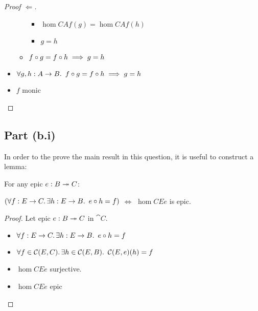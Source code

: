\begin{prop}
\begin{proof}[Proof $\Leftarrow$]
\begin{itemize}
\begin{itemize}
\begin{itemize}
            \item[\iffs] $\hom{C}{A}{f}(g) = \hom{C}{A}{f}(h)$
              \marginnote{\Def-\ref{def:co-hom}}

            \item[\imps] $g = h$
            \end{itemize}

          \item[\imps] $f\compose g = f\compose h \implies g = h$
            \marginnote{\imps-\Intro-$\dagger$}
        \end{itemize}
      \item[\imps] $\forall g, h : A \to B\ldotp~f\compose g = f\compose h \implies g = h$
        \marginnote{$\forall$-\Intro-$\star$}

      \item[\iffs] $f$ monic
        \qedhere
    \end{itemize}
  \end{proof}
\end{prop}

\subsection{Part (b.i)}\label{sec:q-1-b-i}

In order to the prove the main result in this question, it is useful to construct a lemma:

\begin{lemma}\label{lemma:epic-preserve-1}
  For any epic $e : B \epic C$:

  $(\forall f : E\to C\ldotp\exists h : E\to B\ldotp~e\compose h = f)$
  $\iff$ $\hom{C}{E}{e}$ is epic.

  \begin{proof}
    Let epic $e : B \epic C$ in $\cat{C}$.
    \begin{itemize}
      \item[\phs] $\forall f : E\to C\ldotp\exists h : E\to B\ldotp~e\compose h = f$
        \marginnote{\Hyp}
      \item[\iffs]

    $\forall f \in\hom{C}{E}{C}\ldotp\exists h\in\hom{C}{E}{B}\ldotp~\hom{C}{E}{e}(h) = f$
        \marginnote{\Def~\ref{def:hom-set}}

      \item[\iffs]
        $\hom{C}{E}{e}$ surjective.

      \item[\iffs]
        $\hom{C}{E}{e}$ epic
        \qedhere

    \end{itemize}
  \end{proof}
\end{lemma}

